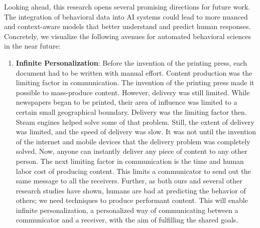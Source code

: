 Looking ahead, this research opens several promising directions for future work. The integration of behavioral data into AI systems could lead to more nuanced and context-aware models that better understand and predict human responses. Concretely, we visualize the following avenues for automated behavioral sciences in the near future:
\begin{enumerate}
    \item \textbf{Infinite Personalization}: Before the invention of the printing press, each document had to be written with manual effort. Content production was the limiting factor in communication. The invention of the printing press made it possible to mass-produce content. However, delivery was still limited. While newspapers began to be printed, their area of influence was limited to a certain small geographical boundary. Delivery was the limiting factor then. Steam engines helped solve some of that problem. Still, the extent of delivery was limited, and the speed of delivery was slow. It was not until the invention of the internet and mobile devices that the delivery problem was completely solved. Now, anyone can instantly deliver any piece of content to any other person. The next limiting factor in communication is the time and human labor cost of producing content. This limits a communicator to send out the same message to all the receivers. Further, as both ours and several other research studies have shown, humans are bad at predicting the behavior of others; we need techniques to produce performant content. This will enable infinite personalization, a personalized way of communicating between a communicator and a receiver, with the aim of fulfilling the shared goals.

    


\end{enumerate}
